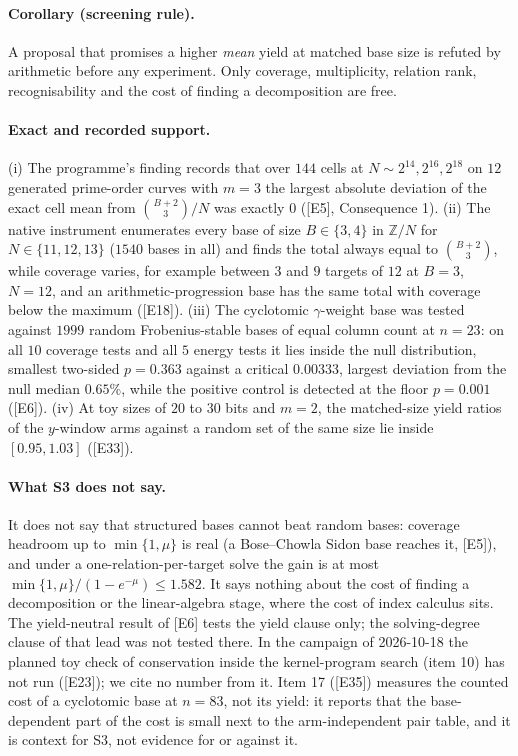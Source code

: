 \documentclass[10pt,a4paper]{article}
\newcommand{\ZZ}{\mathbb{Z}}
\newcommand{\ev}[1]{\textup{[#1]}}
\theoremstyle{definition}
\theoremstyle{remark}
\begin{document}
\paragraph{Corollary (screening rule).}
A proposal that promises a higher \emph{mean} yield at matched base size is refuted
by arithmetic before any experiment. Only coverage, multiplicity, relation rank,
recognisability and the cost of finding a decomposition are free.

\paragraph{Exact and recorded support.}
(i) The programme's finding records that over $144$ cells at $N\sim2^{14},2^{16},2^{18}$
on $12$ generated prime-order curves with $m=3$ the largest absolute deviation of
the exact cell mean from $\binom{B+2}{3}/N$ was exactly $0$ (\ev{E5}, Consequence 1).
(ii) The native instrument enumerates every base of size $B\in\{3,4\}$ in
$\ZZ/N$ for $N\in\{11,12,13\}$ ($1540$ bases in all) and finds the total always equal
to $\binom{B+2}{3}$, while coverage varies, for example between $3$ and $9$ targets
of $12$ at $B=3$, $N=12$, and an arithmetic-progression base has the same total
with coverage below the maximum (\ev{E18}). (iii) The cyclotomic $\gamma$-weight base
was tested against $1999$ random Frobenius-stable bases of equal column count at
$n=23$: on all $10$ coverage tests and all $5$ energy tests it lies inside the null
distribution, smallest two-sided $p=0.363$ against a critical $0.00333$, largest
deviation from the null median $0.65\%$, while the positive control is detected
at the floor $p=0.001$ (\ev{E6}). (iv) At toy sizes of $20$ to $30$ bits and $m=2$, the matched-size yield ratios of
the $y$-window arms against a random set of the same size lie inside $[0.95,1.03]$
(\ev{E33}).

\paragraph{What S3 does not say.}
It does not say that structured bases cannot beat random bases: coverage headroom
up to $\min\{1,\mu\}$ is real (a Bose--Chowla Sidon base reaches it, \ev{E5}), and
under a one-relation-per-target solve the gain is at most
$\min\{1,\mu\}/(1-e^{-\mu})\le1.582$. It says nothing about the cost of finding a
decomposition or the linear-algebra stage, where the cost of index calculus sits.
The yield-neutral result of \ev{E6} tests the yield clause only; the solving-degree
clause of that lead was not tested there. In the campaign of 2026-10-18 the planned
toy check of conservation inside the kernel-program search (item 10) has not run
(\ev{E23}); we cite no number from it. Item 17 (\ev{E35}) measures the counted cost of a cyclotomic base at $n=83$, not its yield: it reports that the base-dependent part of the cost is small next to the arm-independent pair table, and it is context for S3, not evidence for or against it.
\end{document}

